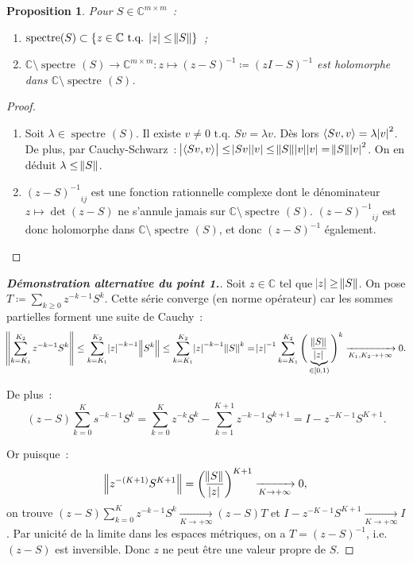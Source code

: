 \documentclass{report}
\DeclareMathOperator{\spectreOperator}{spectre\!}
\newcommand{\C}{{\mathbb C}}
\newcommand{\scpr}[2]{\left\langle#1, #2\right\rangle}
\newcommand{\tq}{\text{ t.q. }}
\newcommand{\st}{\tq}
\newcommand{\pinfty}{{+\infty}}
\newcommand{\spectre}[1]{{\spectreOperator\left(#1\right)}}
\newtheorem{prp}[thm]{Proposition}
\theoremstyle{definition}
\theoremstyle{remark}
\begin{document}
\begin{prp} Pour $S \in \C^{m \times m}$~:
\begin{enumerate}
	\item $\spectre S \subset \{z \in \C \st \abs z \leq \norm S\}$~;
	\item $\C \setminus \spectre S \to \C^{m \times m} : z \mapsto (z-S)^{-1} \coloneqq (zI - S)^{-1}$ est holomorphe dans $\C \setminus \spectre S$.
\end{enumerate}
\end{prp}

\begin{proof}~
\begin{enumerate}
	\item Soit $\lambda \in \spectre S$. Il existe $v \neq 0 \st Sv = \lambda v$. Dès lors $\scpr {Sv}v = \lambda\abs v^2$. De plus, par Cauchy-Schwarz~:
	$\abs {\scpr {Sv}v} \leq \abs {Sv}\abs v \leq \norm S\abs v\abs v = \norm S\abs v^2$. On en déduit $\lambda \leq \norm S$.
	\item ${(z-S)^{-1}}_{ij}$ est une fonction rationnelle complexe dont le dénominateur $z \mapsto \det(z-S)$ ne s'annule jamais sur $\C \setminus \spectre S$.
	${(z-S)^{-1}}_{ij}$ est donc holomorphe dans $\C \setminus \spectre S$, et donc $(z-S)^{-1}$ également.
\end{enumerate}
\end{proof}

\begin{proof}[\textnormal {\textbf {Démonstration alternative du point 1.}}]
Soit $z \in \C$ tel que $\abs z \geq \norm S$. On pose $T \coloneqq \sum_{k \geq 0}z^{-k-1}S^k$. Cette série converge (en norme opérateur) car les sommes
partielles forment une suite de Cauchy~:
\[
	\norm {\sum_{k=K_1}^{K_2}z^{-k-1}S^k} \leq \sum_{k=K_1}^{K_2}\abs z^{-k-1}\norm {S^k} \leq \sum_{k=K_1}^{K_2}\abs z^{-k-1}\norm S^k
	= \abs z^{-1}\sum_{k=K_1}^{K_2}\Bigg(\underbrace {\frac {\norm S}{\abs z}}_{\in [0, 1)}\Bigg)^k \xrightarrow[K_1,K_2 \to \pinfty]{} 0.
\]

De plus~:
\[(z-S)\sum_{k=0}^Ks^{-k-1}S^k = \sum_{k=0}^Kz^{-k}S^k - \sum_{k=1}^{K+1}z^{-k-1}S^{k+1} = I - z^{-K-1}S^{K+1}.\]

Or puisque~:
\[\norm {z^{-(K+1)}S^{K+1}} = \left(\frac {\norm S}{\abs z}\right)^{K+1} \xrightarrow[K \to \pinfty]{} 0,\]
on trouve $(z-S)\sum_{k=0}^Kz^{-k-1}S^k \xrightarrow[K \to \pinfty]{} (z-S)T$ et $I-z^{-K-1}S^{K+1} \xrightarrow[K \to \pinfty]{} I$. Par unicité de la limite
dans les espaces métriques, on a $T = (z-S)^{-1}$, i.e. $(z-S)$ est inversible. Donc $z$ ne peut être une valeur propre de $S$.
\end{proof}
\end{document}
